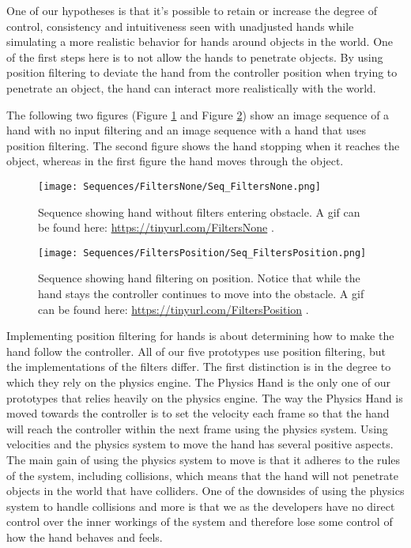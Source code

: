 One of our hypotheses is that it's possible to retain or increase the degree of control, consistency and intuitiveness seen with unadjusted hands while simulating a more realistic behavior for hands around objects in the world. One of the first steps here is to not allow the hands to penetrate objects. By using position filtering to deviate the hand from the controller position when trying to penetrate an object, the hand can interact more realistically with the world.

The following two figures (Figure \ref{fig:filtersNone} and Figure \ref{fig:filtersPosition}) show an image sequence of a hand with no input filtering and an image sequence with a hand that uses position filtering. The second figure shows the hand stopping when it reaches the object, whereas in the first figure the hand moves through the object.

\begin{figure}[H]
\centering
\texttt{[image: Sequences/FiltersNone/Seq\_FiltersNone.png]}
\caption{Sequence showing hand without filters entering obstacle. A gif can be found here: \url{https://tinyurl.com/FiltersNone} .}
\label{fig:filtersNone}
\end{figure}

\begin{figure}[H]
\centering
\texttt{[image: Sequences/FiltersPosition/Seq\_FiltersPosition.png]}
\caption{Sequence showing hand filtering on position. Notice that while the hand stays the controller continues to move into the obstacle. A gif can be found here: \url{https://tinyurl.com/FiltersPosition} .}
\label{fig:filtersPosition}
\end{figure}

Implementing position filtering for hands is about determining how to make the hand follow the controller. All of our five prototypes use position filtering, but the implementations of the filters differ. The first distinction is in the degree to which they rely on the physics engine. The Physics Hand is the only one of our prototypes that relies heavily on the physics engine. The way the Physics Hand is moved towards the controller is to set the velocity each frame so that the hand will reach the controller within the next frame using the physics system. Using velocities and the physics system to move the hand has several positive aspects. The main gain of using the physics system to move is that it adheres to the rules of the system, including collisions, which means that the hand will not penetrate objects in the world that have colliders. One of the downsides of using the physics system to handle collisions and more is that we as the developers have no direct control over the inner workings of the system and therefore lose some control of how the hand behaves and feels.

